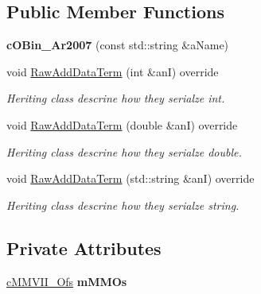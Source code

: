 \subsection*{Public Member Functions}
\begin{DoxyCompactItemize}
\item 
{\bfseries c\+O\+Bin\+\_\+\+Ar2007} (const std\+::string \&a\+Name)\hypertarget{classMMVII_1_1cOBin__Ar2007_a606634c3c07a3376412bfc7c5ff0422e}{}\label{classMMVII_1_1cOBin__Ar2007_a606634c3c07a3376412bfc7c5ff0422e}

\item 
void \hyperlink{classMMVII_1_1cOBin__Ar2007_a3b7202a0f2a0abac62eec45031e50245}{Raw\+Add\+Data\+Term} (int \&anI) override\hypertarget{classMMVII_1_1cOBin__Ar2007_a3b7202a0f2a0abac62eec45031e50245}{}\label{classMMVII_1_1cOBin__Ar2007_a3b7202a0f2a0abac62eec45031e50245}

\begin{DoxyCompactList}\small\item\em Heriting class descrine how they serialze int. \end{DoxyCompactList}\item 
void \hyperlink{classMMVII_1_1cOBin__Ar2007_a3a32ad07ada2e1aed700a988caa866ff}{Raw\+Add\+Data\+Term} (double \&anI) override\hypertarget{classMMVII_1_1cOBin__Ar2007_a3a32ad07ada2e1aed700a988caa866ff}{}\label{classMMVII_1_1cOBin__Ar2007_a3a32ad07ada2e1aed700a988caa866ff}

\begin{DoxyCompactList}\small\item\em Heriting class descrine how they serialze double. \end{DoxyCompactList}\item 
void \hyperlink{classMMVII_1_1cOBin__Ar2007_a780074552ce2a48e69561424319c4e8b}{Raw\+Add\+Data\+Term} (std\+::string \&anI) override\hypertarget{classMMVII_1_1cOBin__Ar2007_a780074552ce2a48e69561424319c4e8b}{}\label{classMMVII_1_1cOBin__Ar2007_a780074552ce2a48e69561424319c4e8b}

\begin{DoxyCompactList}\small\item\em Heriting class descrine how they serialze string. \end{DoxyCompactList}\end{DoxyCompactItemize}
\subsection*{Private Attributes}
\begin{DoxyCompactItemize}
\item 
\hyperlink{classMMVII_1_1cMMVII__Ofs}{c\+M\+M\+V\+I\+I\+\_\+\+Ofs} {\bfseries m\+M\+M\+Os}\hypertarget{classMMVII_1_1cOBin__Ar2007_ac74798e886710e49960d4b1ec59dc5cd}{}\label{classMMVII_1_1cOBin__Ar2007_ac74798e886710e49960d4b1ec59dc5cd}

\end{DoxyCompactItemize}
